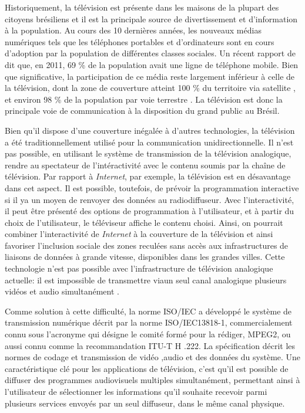 \documentclass[12pt,a4paper]{article}
\begin{document}
Historiquement, la télévision est présente dans les maisons de la plupart des citoyens brésiliens et il est la principale source de divertissement et d'information à la population. Au cours des 10 dernières années, les nouveaux médias numériques tels que les téléphones portables et d'ordinateurs sont en cours d'adoption par la population de différentes classes sociales. Un récent rapport de \cite{pnad2011} dit que, en 2011, 69 \% de la population avait une ligne de téléphone mobile. Bien que significative, la participation de ce média reste largement inférieur à celle de la télévision, dont la zone de couverture atteint 100 \% du territoire via satellite \cite{StarOne}, et environ 98 \% de la population par voie terrestre \cite{globo}. La télévision est donc la principale voie de communication à la disposition du grand public au Brésil.

Bien qu'il dispose d'une couverture inégalée à d'autres technologies, la télévision a été traditionnellement utilisé pour la communication unidirectionnelle. Il n'est pas possible, en utilisant le système de transmission de la télévision analogique, rendre au spectateur de l'intéractivité avec le contenu soumis par la chaîne de télévision. Par rapport à \textit{Internet}, par exemple, la télévision est en désavantage dans cet aspect. Il est possible, toutefois, de prévoir la programmation interactive si il ya un moyen de renvoyer des données au radiodiffuseur. Avec l'interactivité, il peut être présenté des options de programmation à l'utilisateur, et à partir du choix de l'utilisateur, le téléviseur affiche le contenu choisi. Ainsi, on pourrait combiner l'interactivité de \textit{Internet} à la couverture de la télévision et ainsi favoriser l'inclusion sociale des zones reculées sans accès aux infrastructures de liaisons de données à grande vitesse, disponibles dans les grandes villes. Cette technologie n'est pas possible avec l'infrastructure de télévision analogique actuelle: il est impossible de transmettre viaun seul canal analogique plusieurs vidéos et audio simultanément .

Comme solution à cette difficulté, la norme ISO/IEC a développé le système de transmission numérique décrit par la norme ISO/IEC13818-1, commercialement connu sous l'acronyme qui désigne le comité formé pour la rédiger, MPEG2, ou aussi connu comme la recommandation ITU-T H .222. La spécification décrit les normes de codage et transmission de vidéo ,audio et des données du système. Une caractéristique clé pour les applications de télévision, c'est qu'il est possible de diffuser des programmes audiovisuels multiples simultanément, permettant ainsi à l'utilisateur de sélectionner les informations qu'il souhaite recevoir parmi plusieurs services envoyés par un seul diffuseur, dans le même canal physique.
\end{document}

